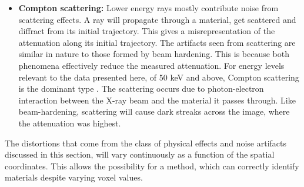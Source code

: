 \begin{itemize}
  \item \textbf{Compton scattering:} Lower energy rays mostly contribute noise
      from scattering effects. A ray will propagate through a material, get
      scattered and diffract from its initial trajectory. This gives a
      misrepresentation of the attenuation along its initial trajectory. The
      artifacts seen from scattering are similar in nature to those formed by
      beam hardening. This is because both phenomena effectively reduce the
      measured attenuation. For energy levels relevant to the data presented
      here, of 50 keV and above, Compton scattering is the dominant type
      \citep{Compton}. The scattering occurs due to photon-electron interaction
      between the X-ray beam and the material it passes through. Like
      beam-hardening, scattering will cause dark streaks across the image,
      where the attenuation was highest.
\end{itemize}

The distortions that come from the class of physical effects and noise
artifacts discussed in this section, will vary continuously as a function of
the spatial coordinates. This allows the possibility for a method, which can
correctly identify materials despite varying voxel values.




